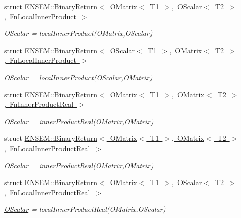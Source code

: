 \begin{DoxyCompactItemize}
struct \mbox{\hyperlink{structENSEM_1_1BinaryReturn_3_01OMatrix_3_01T1_01_4_00_01OScalar_3_01T2_01_4_00_01FnLocalInnerProduct_01_4}{E\+N\+S\+E\+M\+::\+Binary\+Return$<$ O\+Matrix$<$ T1 $>$, O\+Scalar$<$ T2 $>$, Fn\+Local\+Inner\+Product $>$}}
\begin{DoxyCompactList}\small\item\em \mbox{\hyperlink{classENSEM_1_1OScalar}{O\+Scalar}} = local\+Inner\+Product(\+O\+Matrix,\+O\+Scalar) \end{DoxyCompactList}\item 
struct \mbox{\hyperlink{structENSEM_1_1BinaryReturn_3_01OScalar_3_01T1_01_4_00_01OMatrix_3_01T2_01_4_00_01FnLocalInnerProduct_01_4}{E\+N\+S\+E\+M\+::\+Binary\+Return$<$ O\+Scalar$<$ T1 $>$, O\+Matrix$<$ T2 $>$, Fn\+Local\+Inner\+Product $>$}}
\begin{DoxyCompactList}\small\item\em \mbox{\hyperlink{classENSEM_1_1OScalar}{O\+Scalar}} = local\+Inner\+Product(\+O\+Scalar,\+O\+Matrix) \end{DoxyCompactList}\item 
struct \mbox{\hyperlink{structENSEM_1_1BinaryReturn_3_01OMatrix_3_01T1_01_4_00_01OMatrix_3_01T2_01_4_00_01FnInnerProductReal_01_4}{E\+N\+S\+E\+M\+::\+Binary\+Return$<$ O\+Matrix$<$ T1 $>$, O\+Matrix$<$ T2 $>$, Fn\+Inner\+Product\+Real $>$}}
\begin{DoxyCompactList}\small\item\em \mbox{\hyperlink{classENSEM_1_1OScalar}{O\+Scalar}} = inner\+Product\+Real(\+O\+Matrix,\+O\+Matrix) \end{DoxyCompactList}\item 
struct \mbox{\hyperlink{structENSEM_1_1BinaryReturn_3_01OMatrix_3_01T1_01_4_00_01OMatrix_3_01T2_01_4_00_01FnLocalInnerProductReal_01_4}{E\+N\+S\+E\+M\+::\+Binary\+Return$<$ O\+Matrix$<$ T1 $>$, O\+Matrix$<$ T2 $>$, Fn\+Local\+Inner\+Product\+Real $>$}}
\begin{DoxyCompactList}\small\item\em \mbox{\hyperlink{classENSEM_1_1OScalar}{O\+Scalar}} = inner\+Product\+Real(\+O\+Matrix,\+O\+Matrix) \end{DoxyCompactList}\item 
struct \mbox{\hyperlink{structENSEM_1_1BinaryReturn_3_01OMatrix_3_01T1_01_4_00_01OScalar_3_01T2_01_4_00_01FnLocalInnerProductReal_01_4}{E\+N\+S\+E\+M\+::\+Binary\+Return$<$ O\+Matrix$<$ T1 $>$, O\+Scalar$<$ T2 $>$, Fn\+Local\+Inner\+Product\+Real $>$}}
\begin{DoxyCompactList}\small\item\em \mbox{\hyperlink{classENSEM_1_1OScalar}{O\+Scalar}} = local\+Inner\+Product\+Real(\+O\+Matrix,\+O\+Scalar) \end{DoxyCompactList}\item 

\end{DoxyCompactItemize}

